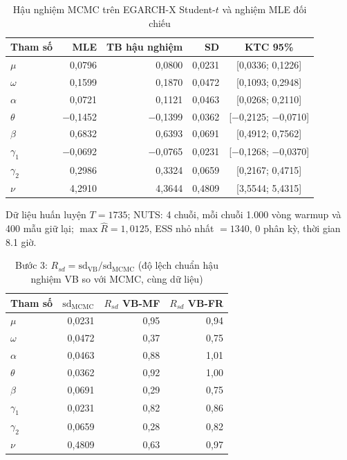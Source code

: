 \documentclass[11pt,a4paper]{article}
\begin{document}
\begin{table}[H]\centering\normalsize
\caption{Hậu nghiệm MCMC trên EGARCH-X Student-$t$ và nghiệm MLE đối chiếu}\label{tab:b3-mcmc}
\begin{tabular}{l r r r c}
\toprule
\textbf{Tham số} & \textbf{MLE} & \textbf{TB hậu nghiệm} & \textbf{SD} & \textbf{KTC 95\%} \\
\midrule
$\mu$ & 0,0796 & 0,0800 & 0,0231 & [0,0336; 0,1226] \\
$\omega$ & 0,1599 & 0,1870 & 0,0472 & [0,1093; 0,2948] \\
$\alpha$ & 0,0721 & 0,1121 & 0,0463 & [0,0268; 0,2110] \\
$\theta$ & $-$0,1452 & $-$0,1399 & 0,0362 & [$-$0,2125; $-$0,0710] \\
$\beta$ & 0,6832 & 0,6393 & 0,0691 & [0,4912; 0,7562] \\
$\gamma_1$ & $-$0,0692 & $-$0,0765 & 0,0231 & [$-$0,1268; $-$0,0370] \\
$\gamma_2$ & 0,2986 & 0,3324 & 0,0659 & [0,2167; 0,4715] \\
$\nu$ & 4,2910 & 4,3644 & 0,4809 & [3,5544; 5,4315] \\
\bottomrule
\end{tabular}
\par\vspace{0.25em}\begin{minipage}{0.95\textwidth}\scriptsize Dữ liệu huấn luyện $T=1735$; NUTS: 4 chuỗi, mỗi chuỗi 1.000 vòng warmup và 400 mẫu giữ lại; $\max\hat R=1,0125$, ESS nhỏ nhất $=1340$, 0 phân kỳ, thời gian 8.1 giờ.\end{minipage}
\end{table}
\begin{table}[H]\centering\normalsize
\caption{Bước 3: $R_{sd}=\mathrm{sd}_{\text{VB}}/\mathrm{sd}_{\text{MCMC}}$ (độ lệch chuẩn hậu nghiệm VB so với MCMC, cùng dữ liệu)}\label{tab:b3-rsd}
\begin{tabular}{l r r r}
\toprule
\textbf{Tham số} & $\mathrm{sd}_{\text{MCMC}}$ & $R_{sd}$ VB-MF & $R_{sd}$ VB-FR \\
\midrule
$\mu$ & 0,0231 & 0,95 & 0,94 \\
$\omega$ & 0,0472 & 0,37 & 0,75 \\
$\alpha$ & 0,0463 & 0,88 & 1,01 \\
$\theta$ & 0,0362 & 0,92 & 1,00 \\
$\beta$ & 0,0691 & 0,29 & 0,75 \\
$\gamma_1$ & 0,0231 & 0,82 & 0,86 \\
$\gamma_2$ & 0,0659 & 0,28 & 0,82 \\
$\nu$ & 0,4809 & 0,63 & 0,97 \\
\bottomrule
\end{tabular}
\end{table}
\end{document}
